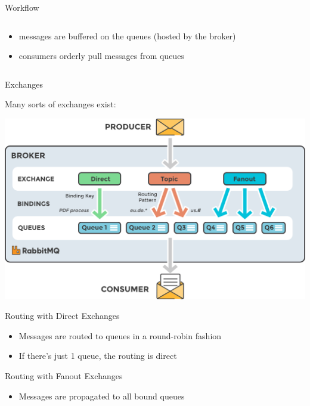 \documentclass{beamer}\mode<presentation>{\usetheme{AMSBolognaFC}}
\begin{document}
\begin{frame}{Workflow}
\begin{columns}
\begin{column}{.5\linewidth}
\begin{itemize}
                \medskip

                \item[4] messages are buffered on the \alert{queues} (hosted by the \alert{broker})

                \medskip

                \item[5] consumers orderly pull messages from queues
            \end{itemize}
        \end{column}
    \end{columns}

\end{frame}

\begin{frame}{Exchanges}

    Many sorts of exchanges exist:
    \begin{center}
        \includegraphics[width=.8\linewidth]{img/exchanges.png}
    \end{center}

\end{frame}

\begin{frame}{Routing with Direct Exchanges}

    \begin{itemize}
        \item Messages are routed to queues in a \alert{round-robin} fashion

        \bigskip

        \item If there's just 1 queue, the routing is \alert{direct}
    \end{itemize}

\end{frame}

\begin{frame}{Routing with Fanout Exchanges}

    \begin{itemize}
        \item Messages are propagated to all bound queues
    \end{itemize}

\end{frame}
\end{document}
